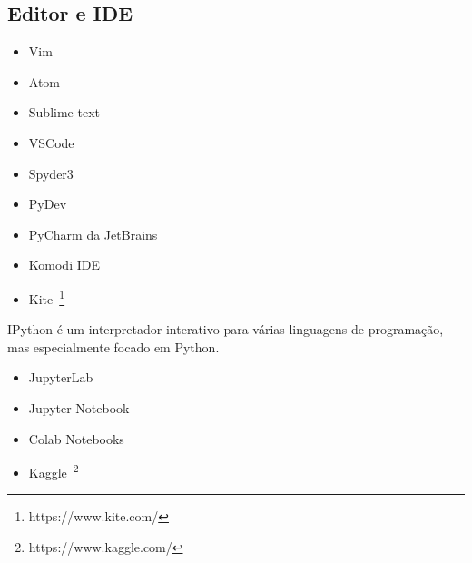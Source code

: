 \subsection{Editor e IDE}

\begin{itemize}
    \item Vim
    \item Atom
    \item Sublime-text
    \item VSCode
    \item Spyder3
    \item PyDev
    \item PyCharm da JetBrains
    \item Komodi IDE
    \item Kite~\footnote{https://www.kite.com/}
\end{itemize}


IPython é um interpretador interativo para várias linguagens de programação, mas especialmente focado em Python.

\begin{itemize}
	\item JupyterLab
	\item Jupyter Notebook
	\item Colab Notebooks
	\item Kaggle~\footnote{https://www.kaggle.com/}
\end{itemize}
